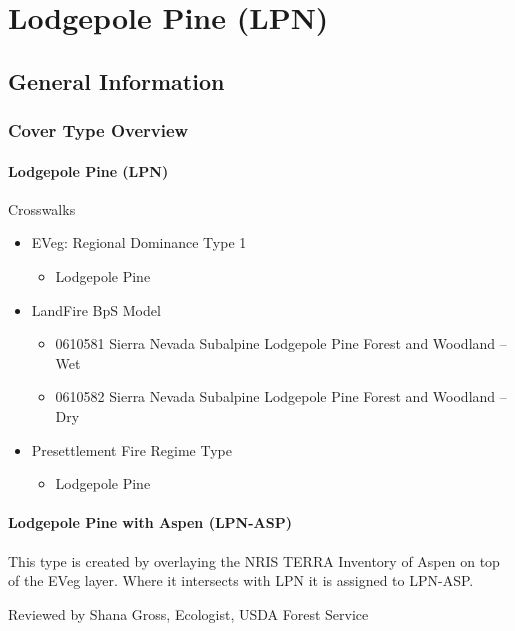 \newpage
\section{Lodgepole Pine (LPN)}

\subsection*{General Information}

\subsubsection{Cover Type Overview}

\paragraph{Lodgepole Pine (LPN)}

Crosswalks
\begin{itemize}
	\item EVeg: Regional Dominance Type 1
	\begin{itemize}
		\item Lodgepole Pine
	\end{itemize}

	\item LandFire BpS Model
	\begin{itemize}
		\item 0610581 Sierra Nevada Subalpine Lodgepole Pine Forest and Woodland – Wet
		\item 0610582 Sierra Nevada Subalpine Lodgepole Pine Forest and Woodland – Dry

	\end{itemize}

	\item Presettlement Fire Regime Type
	\begin{itemize}
		\item Lodgepole Pine
	\end{itemize}
\end{itemize}

\paragraph{Lodgepole Pine with Aspen (LPN-ASP)}
This type is created by overlaying the NRIS TERRA Inventory of Aspen on top of the EVeg layer. Where it intersects with LPN it is assigned to LPN-ASP.

Reviewed by Shana Gross, Ecologist, USDA Forest Service

